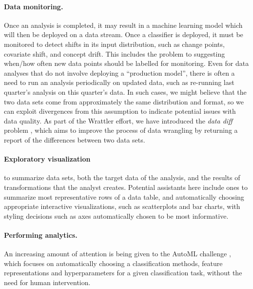 \documentclass[sigplan,preprint,10pt]{acmart}\settopmatter{printfolios=true,printccs=false,printacmref=false}
\theoremstyle{plain}
\theoremstyle{definition}
\begin{document}
{{\paragraph{Data monitoring.} Once an analysis
is completed, it may result in a machine learning
model which will then be deployed on a data stream.
Once a classifier is deployed, it must be monitored
to detect shifts in its input distribution,
such as change points, covariate shift, and
concept drift. This includes the problem
to suggesting when/how often new data points should be labelled for monitoring.
Even for data analyses that do not involve
deploying a ``production model'', there is
often a need to run an analysis periodically on updated data, such as re-running last quarter's
analysis on this quarter's data.
In such cases, we might believe that the two data
sets come from approximately the same distribution
and format, so we can exploit
divergences from this assumption to indicate
potential issues with data quality.
As part of the Wrattler effort, we have
introduced the \emph{data diff} problem \cite{datadiff},
which aims to improve the process of data wrangling by
returning a report of the differences between two data sets.

\paragraph{Exploratory visualization} to summarize
data sets, both the target data of the analysis,
and the results of transformations that the analyst
creates. Potential assistants here include ones
to summarize most representative rows of a data table,
and automatically choosing appropriate interactive
visualizations, such as scatterplots and bar charts,
with styling decisions such as axes automatically
chosen to be most informative.

\paragraph{Performing analytics.}
An increasing amount of attention is being
given to the AutoML challenge \cite{guyon_review_2016}, which focuses
on automatically choosing a classification
methods, feature representations and hyperparameters
for a given classification task, without the need for human intervention.

}}
\end{document}
